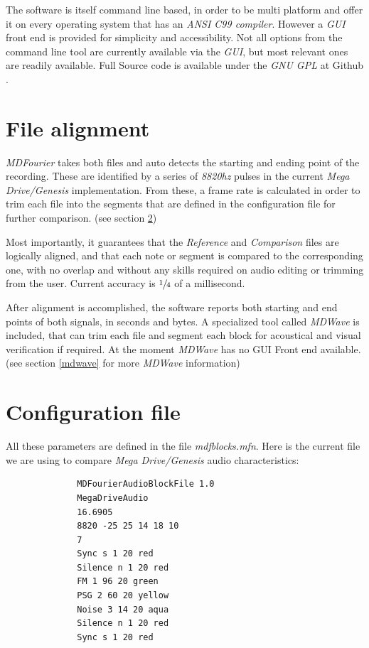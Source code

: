 \documentclass[10pt,a4paper]{report}
\begin{document}
The software is itself command line based, in order to be multi platform and offer it on every operating system that has an \textit{ANSI C99 compiler}. However a \textit{GUI} front end is provided for simplicity and accessibility. Not all options from the command line tool are currently available via the \textit{GUI}, but most relevant ones are readily available. Full Source code is available under the \textit{GNU GPL} at Github \cite{sourcecode}.

\section{File alignment}

\textit{MDFourier} takes both files and auto detects the starting and ending point of the recording. These are identified by a series of \textit{8820hz} pulses in the current \textit{Mega Drive/Genesis} implementation. From these, a frame rate is calculated in order to trim each file into the segments that are defined in the configuration file for further comparison. (see section \ref{mfnconfig})

Most importantly, it guarantees that the \textit{Reference} and \textit{Comparison} files are logically aligned, and that each note or segment is compared to the corresponding one, with no overlap and without any skills required on audio editing or trimming from the user. Current accuracy is $\sfrac{1}{4}$ of a millisecond.

After alignment is accomplished, the software reports both starting and end points of both signals, in seconds and bytes. A specialized tool called \textit{MDWave} is included, that can trim each file and segment each block for acoustical and visual verification if required. At the moment \textit{MDWave} has no GUI Front end available. (see section \ref{mdwave} for more \textit{MDWave} information) 

\section{Configuration file}
\label{mfnconfig}

All these parameters are defined in the file \textit{mdfblocks.mfn}. Here is the current file we are using to compare \textit{Mega Drive/Genesis} audio characteristics:

\begin{verbatim}
              MDFourierAudioBlockFile 1.0
              MegaDriveAudio
              16.6905
              8820 -25 25 14 18 10
              7
              Sync s 1 20 red
              Silence n 1 20 red
              FM 1 96 20 green
              PSG 2 60 20 yellow
              Noise 3 14 20 aqua
              Silence n 1 20 red
              Sync s 1 20 red
\end{verbatim}
\end{document}
